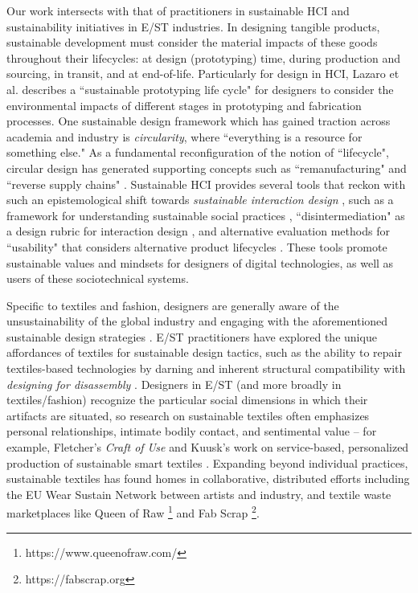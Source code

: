 \documentclass[manuscript,review,anonymous]{acmart}
\begin{document}
Our work intersects with that of practitioners in sustainable HCI and sustainability initiatives in E/ST industries. In designing tangible products, sustainable development must consider the material impacts of these goods throughout their lifecycles: at design (prototyping) time, during production and sourcing, in transit, and at end-of-life. Particularly for design in HCI, Lazaro et al. \cite{lazaro_sustainable_2020} describes a ``sustainable prototyping life cycle" for designers to consider the environmental impacts of different stages in prototyping and fabrication processes. One sustainable design framework which has gained traction across academia and industry is \textit{circularity}, where ``everything is a resource for something else." \cite{c2c_green_2017} As a fundamental reconfiguration of the notion of ``lifecycle", circular design has generated supporting concepts such as ``remanufacturing" \cite{nasr_fundamentals_2020} and ``reverse supply chains" \cite{battaia_reverse_2015}. Sustainable HCI provides several tools that reckon with such an epistemological shift towards \textit{sustainable interaction design} \cite{blevis_sid_2007}, such as a framework for understanding sustainable social practices \cite{entwistle_beyond_2015}, ``disintermediation" as a design rubric for interaction design \cite{raghavan_means_2017}, and alternative evaluation methods for ``usability" that considers alternative product lifecycles \cite{remy_evaluation_2018}. These tools promote sustainable values and mindsets for designers of digital technologies, as well as users of these sociotechnical systems. 

Specific to textiles and fashion, designers are generally aware of the unsustainability of the global industry and engaging with the aforementioned sustainable design strategies \cite{brydges_closing_2021, kohler_challenges_2013, veske_review_2020}. E/ST practitioners have explored the unique affordances of textiles for sustainable design tactics, such as the ability to repair textiles-based technologies by darning \cite{jones_e-darning_2021} and inherent structural compatibility with \textit{designing for disassembly} \cite{wu_unfabricate_2020}. Designers in E/ST (and more broadly in textiles/fashion) recognize the particular social dimensions in which their artifacts are situated, so research on sustainable textiles often emphasizes personal relationships, intimate bodily contact, and sentimental value -- for example, Fletcher's \textit{Craft of Use} \cite{fletcher_craft_2016} and Kuusk's work on service-based, personalized production of sustainable smart textiles \cite{kuusk_crafting_2016}. Expanding beyond individual practices, sustainable textiles has found homes in collaborative, distributed efforts including the EU Wear Sustain Network \cite{goodman_wear_2018} between artists and industry, and textile waste marketplaces like Queen of Raw \footnote{https://www.queenofraw.com/} and Fab Scrap \footnote{https://fabscrap.org}.
\end{document}

